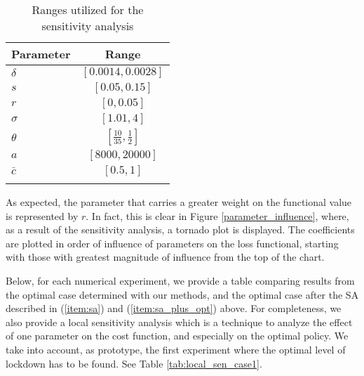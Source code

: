 \documentclass{amsart}
\begin{document}
\begin{table}[htbp]
	\centering
	\caption{Ranges utilized for the sensitivity analysis}
	\begin{tabular}{lc}
	     \multicolumn{1}{c}{Parameter } & \multicolumn{1}{c}{Range}  \\ \hline \vspace{0.1cm}
		 $\delta$ & $[0.0014, 0.0028]$  \\   \vspace{0.2cm}
		$s$ & $[0.05, 0.15]$   \\   \vspace{0.2cm}
		$r$ & $[0, 0.05]$   \\   \vspace{0.2cm}
		$\sigma$   & $[1.01, 4]$ \\   \vspace{0.2cm}
		$\theta$  & $[\frac{10}{35}, \frac{1}{2}]$  \\   \vspace{0.2cm}
		$a$  & $[8000, 20000]$  \\   \vspace{0.2cm}
		$\bar{c}$ & $[0.5,1]$ \\  \hline \vspace{0.2cm}
	\end{tabular}%
	\label{tab:interval}%
\end{table}%
As expected, the parameter that carries a greater weight on the functional value is represented by $r$. In fact, this is clear in Figure \ref{parameter_influence}, where, as a result of the sensitivity analysis, a tornado plot is displayed. The coefficients are plotted in order of influence of parameters on the loss functional, starting with those with greatest magnitude of influence from the top of the chart.  

Below, for each numerical experiment, we provide a table 
comparing results from the optimal case determined
with our methods, and the optimal case after the
SA described in  (\ref{item:sa}) and (\ref{item:sa_plus_opt})
above.  
For completeness, we also provide a local sensitivity analysis which is a technique to analyze the effect of one parameter on the cost function, and especially on the optimal policy. We take into account, as prototype, the first experiment where the optimal level of lockdown has to be found. See Table \ref{tab:local_sen_case1}. 
\end{document}
